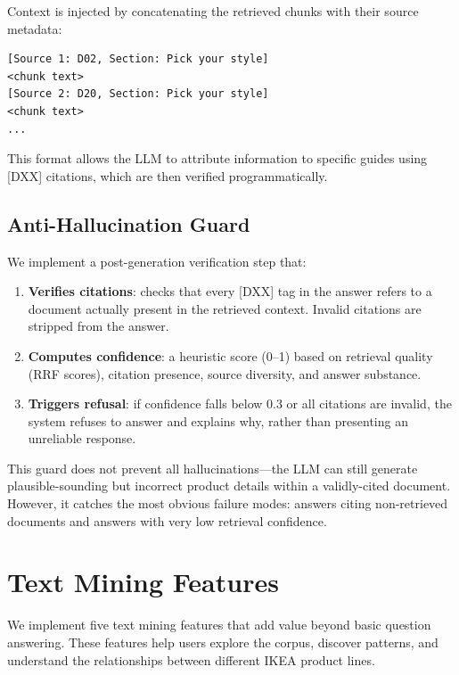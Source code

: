 \documentclass[conference]{IEEEtran}
\begin{document}
Context is injected by concatenating the retrieved chunks with their source metadata:

\begin{verbatim}
[Source 1: D02, Section: Pick your style]
<chunk text>
[Source 2: D20, Section: Pick your style]
<chunk text>
...
\end{verbatim}

This format allows the LLM to attribute information to specific guides using [DXX] citations, which are then verified programmatically.

\subsection{Anti-Hallucination Guard}

We implement a post-generation verification step that:

\begin{enumerate}
    \item \textbf{Verifies citations}: checks that every [DXX] tag in the answer refers to a document actually present in the retrieved context. Invalid citations are stripped from the answer.
    \item \textbf{Computes confidence}: a heuristic score (0--1) based on retrieval quality (RRF scores), citation presence, source diversity, and answer substance.
    \item \textbf{Triggers refusal}: if confidence falls below 0.3 or all citations are invalid, the system refuses to answer and explains why, rather than presenting an unreliable response.
\end{enumerate}

This guard does not prevent all hallucinations---the LLM can still generate plausible-sounding but incorrect product details within a validly-cited document. However, it catches the most obvious failure modes: answers citing non-retrieved documents and answers with very low retrieval confidence.

\section{Text Mining Features}

We implement five text mining features that add value beyond basic question answering. These features help users explore the corpus, discover patterns, and understand the relationships between different IKEA product lines.
\end{document}
